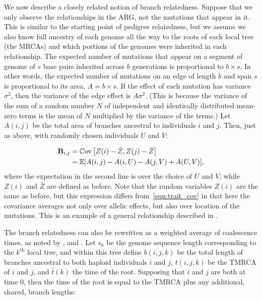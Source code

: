 We now describe a closely related notion of branch relatedness.
%
Suppose that we only observe the relationships in the ARG,
not the mutations that appear in it.
%
This is similar to the starting point of pedigree relatedness,
but we assume we also know full ancestry of each genome all the way to the roots
of each local tree (the MRCAs) and
which portions of the genomes were inherited in each relationship.
%
The expected number of mutations that appear on a segment of genome of $s$ base pairs
inherited across $b$ generations is proportional to $b \times s$.
%
In other words, the expected number of mutations on an edge of length $b$ and span $s$
is proportional to its area, $A = b \times s$.
%
If the effect of each mutation has variance $\sigma^2$,
then the variance of the edge effect is $A \sigma^2$.
%
(This is because the variance of the sum of a random number $N$ of
independent and identically distributed mean-zero terms is
the mean of $N$ multiplied by the variance of the terms.)
%
Let $A(i,j)$ be the total area of branches ancestral to individuals $i$ and $j$.
%
Then, just as above, with randomly chosen individuals $U$ and $V$:
%

\begin{align} \label{eqn:branch_cov}
    \mathbf{B}_{i,j}
         &=\mathbb{C}\text{ov}\left[Z(i) - \bar{Z}, Z(j) - \bar{Z}\right] \notag \\
         &= \mathbb{E}[A(i,j) - A(i,U) - A(j,V) + A(U,V)] , 
\end{align}
%
where the expectation in the second line is over the choice of $U$ and $V$,
while $Z(i)$ and $\bar{Z}$ are defined as before.
%
Note that the random variables $Z(i)$ are the same as before,
but this expression differs from~\eqref{eqn:trait_cov} in that
here the covariance averages not only over allelic effects,
but also over location of the mutations.
%
This is an example of a general relationship described in \citet{ralph2020efficiently}.

The branch relatedness can also be rewritten as a weighted average of coalescence times,
as noted by \citet{mcvean2009genealogical, fan2022genealogical}, and \citet{zhang2023biobank}.
%
Let $s_k$ be the genome sequence length corresponding to the $k^\text{th}$ local tree,
and within this tree define
$b(i,j,k)$ be the total length of branches ancestral to both haploid individuals $i$ and $j$, $t(i,j,k)$
be the TMRCA of $i$ and $j$, and $\hat{t}(k)$ the time of the root.
%
Supposing that $i$ and $j$ are both at time 0,
then the time of the root is equal to the TMRCA plus any additional, shared, branch lengths:
%

